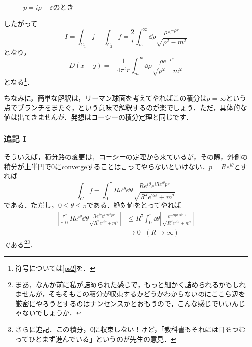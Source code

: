 \documentclass[a4paper,pdflatex,ja=standard]{bxjsarticle}
\begin{document}
\begin{figure}
  \centering
  \caption{$p=i\rho+\varepsilon$のとき}
  \label{p2}
\end{figure}

したがって
\begin{equation}
  I
  =
  \int_{C_{1}}f
  +
  \int_{C_{2}}f
  =
  \frac{2}{i}\int_{m}^{\infty}
  \dd \rho
  \frac{\rho e^{-\rho r}}{\sqrt{\rho^2-m^2}}
\end{equation}
となり，
\begin{equation}
  D(x-y)
  =
  -\frac{1}{4\pi^2 r}
  \int_{m}^{\infty}
  \dd \rho
  \frac{\rho e^{-\rho r}}{\sqrt{\rho^2-m^2}}
  \label{prop}
\end{equation}
となる\footnote{
  符号については\ref{ps2}を．
}．

ちなみに，簡単な解釈は，リーマン球面を考えてやればこの積分は$p=\infty$という点でブランチをまたぐ，という意味で解釈するのが楽でしょう．ただ，具体的な値は出てきませんが．発想はコーシーの積分定理と同じです．

\subsubsection{追記 I}
そういえば，積分路の変更は，コーシーの定理から来ているが，その際，外側の積分が上半円で$0$にconvergeすることは言ってやらないといけない．$p=Re^{i\theta}$とすれば
\begin{equation}
  \int_{C}f
  =
  \int_{0}^{\pi}
  Re^{i\theta}\dd \theta
  \frac{Re^{i\theta}e^{iRe^{i\theta}pr}}{\sqrt{R^2e^{2i\theta}+m^2}} 
\end{equation}
である．ただし，$0\leq\theta\leq\pi$である．絶対値をとってやれば
\begin{align}
  \left|
    \int_{0}^{\pi}
  Re^{i\theta}\dd \theta
  \frac{Re^{i\theta}e^{iRe^{i\theta}pr}}{\sqrt{R^2e^{2i\theta}+m^2}} 
  \right|
  &\leq
  R^2
  \int_{0}^{\pi}
  \dd \theta
  \left|    
  \frac{e^{-Rpr\sin\theta}}{\sqrt{R^2e^{2i\theta}+m^2}} 
  \right|
  \nonumber
  \\
  &\rightarrow
  0
  \ \ \ 
  (R\rightarrow \infty)
\end{align}
である\footnote{
  まあ，なんか前に私が詰められた感じで，もっと細かく詰められるかもしれませんが，そもそもこの積分が収束するかどうかわからないのにここら辺を厳密にやろうとするのはナンセンスかとおもうので，こんな感じでいいんじゃないでしょうか．
}\footnote{さらに追記．この積分，$0$に収束しない！けど，「教科書もそれには目をつむってひとまず進んでいる」というのが先生の意見．}．
\end{document}
